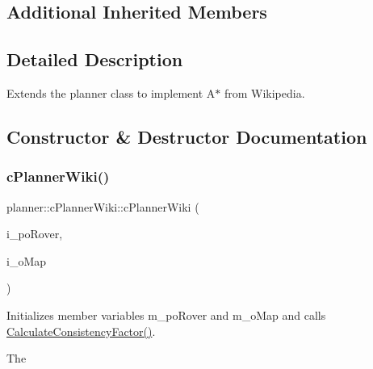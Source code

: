 \subsection*{Additional Inherited Members}


\subsection{Detailed Description}
Extends the planner class to implement A$\ast$ from Wikipedia. 

\subsection{Constructor \& Destructor Documentation}
\mbox{\label{classplanner_1_1c_planner_wiki_aed6ae97e85a338e082ec2879629f0f3b}} 
\subsubsection{\texorpdfstring{c\+Planner\+Wiki()}{cPlannerWiki()}\hspace{0.1cm}{\footnotesize\ttfamily [1/2]}}
{\footnotesize\ttfamily planner\+::c\+Planner\+Wiki\+::c\+Planner\+Wiki (\begin{DoxyParamCaption}\item[{std\+::shared\+\_\+ptr$<$ \mbox{\hyperlink{classplanner_1_1c_rover_interface}{c\+Rover\+Interface}}$<$ 8 $>$$>$}]{i\+\_\+po\+Rover,  }\item[{std\+::shared\+\_\+ptr$<$ \mbox{\hyperlink{classplanner_1_1c_graph}{c\+Graph}} $>$}]{i\+\_\+o\+Map }\end{DoxyParamCaption})}



Initializes member variables m\+\_\+po\+Rover and m\+\_\+o\+Map and calls \mbox{\hyperlink{classplanner_1_1c_planner_a2e5a745f83f903662eff914d8beddb5e}{Calculate\+Consistency\+Factor()}}. 

The \mbox{\label{classplanner_1_1c_planner_wiki_aed6ae97e85a338e082ec2879629f0f3b}} 
